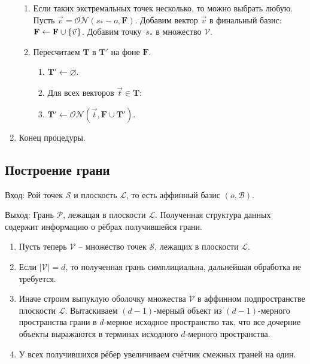 \documentclass[a4paper,12pt]{article}
\newcommand{\Swarm}{\mathcal{S}}              %
\newcommand{\Polyhedron}{\mathcal{P}}         %
\newcommand{\Basis}{\mathcal{B}}              %
\newcommand{\Viewed}{\mathcal{V}}             %
\newcommand{\set}[1]{\left\{ #1 \right\}}                    %
\newcommand{\ONorm}[3][]{\mathcal{ON}#1( #2, #3 #1)} %
\newcommand{\TempVec}{\mathbf{T}}  %
\newcommand{\FinalVec}{\mathbf{F}} %
\newcommand{\Plane}{\mathcal{L}}           %
\renewcommand{\.}{\hspace{0.2ex}}
\begin{document}
\begin{enumerate}
\begin{enumerate}
        \item  Если таких экстремальных точек несколько, то можно выбрать любую. Пусть $\vec v = \ONorm{s_* - o}{\FinalVec}$. Добавим вектор $\vec v$ в финальный базис: $\FinalVec \leftarrow \FinalVec \cup \set{\vec v \.}$. Добавим точку~$s_*$ в множество $\Viewed$.

        \item  Пересчитаем $\TempVec$ в $\TempVec'$ на фоне $\FinalVec$.
        \begin{enumerate}

          \item $\TempVec' \leftarrow \varnothing$.

          \item  Для всех векторов $\vec t \in \TempVec$:

          \item $\TempVec' \leftarrow \ONorm{\vec t}{\FinalVec \cup \TempVec'}$.
        \end{enumerate}

      \end{enumerate}
      \item Конец процедуры.
    \end{enumerate}

  \subsection{Построение грани}
    \label{subsec:FacetConstruction}

    Вход: Рой точек $\Swarm$ и плоскость $\Plane$, то есть аффинный базис $(o, \Basis)$.

    Выход: Грань $\Polyhedron$, лежащая в плоскости $\Plane$. Полученная структура данных содержит информацию о рёбрах получившейся грани.

    \begin{enumerate}
      \item Пусть теперь $\Viewed$ -- множество точек $\Swarm$, лежащих в плоскости $\Plane$.
      \item Если $|\Viewed| = d$, то полученная грань симплициальна, дальнейшая обработка не требуется.
      \item Иначе строим выпуклую оболочку множества $\Viewed$ в аффинном подпространстве плоскости $\Plane$. Вытаскиваем $(d-1)$-мерный объект из $(d-1)$-мерного пространства грани в $d$-мерное исходное пространство так, что все дочерние объекты выражаются в терминах исходного $d$-мерного пространства.
      \item У всех получившихся рёбер увеличиваем счётчик смежных граней на один.
    \end{enumerate}
\end{document}
